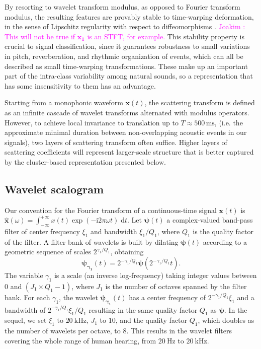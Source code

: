 \documentclass[journal]{IEEEtran}
\makeatletter
\newcommand*{\ie}{i.e.\@\xspace}
\newcommand{\ja}[1]{\textcolor{magenta}{Joakim : #1}}
\makeatother
\begin{document}
By resorting to wavelet transform modulus, as opposed to Fourier transform modulus, the resulting features are provably stable to time-warping deformation,
in the sense of Lipschitz regularity with respect to diffeomorphisms \cite{Mallat2012}. \ja{This will not be true if $\boldsymbol{x_1}$ is an STFT, for example.}
This stability property is crucial to signal classification, since it guarantees robustness to small variations in pitch, reverberation, and rhythmic organization of events, which can all be described as small time-warping transformations. These make up an important part of the intra-class variability among natural sounds, so a representation that has some insensitivity to them has an advantage.

Starting from a monophonic waveform $\boldsymbol{x}(t)$, the scattering transform is defined as an infinite cascade of wavelet transforms alternated with modulus operators.
However, to achieve local invariance to translation up to $T \approx 500\,\mathrm{ms}$, (\ie the approximate minimal duration between non-overlapping acoustic events in our signals), two layers of scattering transform often suffice. Higher layers of scattering coefficients will represent larger-scale structure that is better captured by the cluster-based representation presented below.

\subsection{Wavelet scalogram}
Our convention for the Fourier transform of a continuous-time signal $\boldsymbol{x}(t)$ is $\boldsymbol{\hat{x}}(\omega) = \int_{-\infty}^{+\infty} x(t) \exp(- \mathrm{i} 2\pi \omega t) \; \mathrm{d}t$.
Let $\boldsymbol{\psi}(t)$ a complex-valued band-pass filter of
center frequency $\xi_1$ and bandwidth $\xi_1/Q_1$, where $Q_1$ is the quality factor of the filter.
A filter bank of wavelets is built by dilating $\boldsymbol{\psi}(t)$
according to a geometric sequence of scales $2^{\gamma_1/Q_1}$, obtaining
\begin{equation}
\boldsymbol{\psi_{\gamma_1}}(t) = 2^{-\gamma_1/Q_1} \boldsymbol{\psi}(2^{-\gamma_1/Q_1} t)\mbox{.}
\end{equation}
The variable $\gamma_1$ is a scale (an inverse log-frequency) taking integer values between $0$ and $(J_1 \times Q_1 - 1)$, where $J_1$ is the number of octaves spanned by the filter bank.
For each $\gamma_1$, the wavelet $\boldsymbol{\psi_{\gamma_1}}(t)$
has a center frequency of $2^{-\gamma_1/Q_1}\xi_1$ and a bandwidth of $2^{-\gamma_1/Q_1}\xi_1/Q_1$ resulting in the same quality factor $Q_1$ as $\boldsymbol{\psi}$.
In the sequel, we set $\xi_1$ to $20~\mathrm{kHz}$, $J_1$ to $10$, and the quality factor $Q_1$, which doubles as the number of wavelets per octave, to $8$. This results in the wavelet filters covering the whole range of human hearing, from $20~\mathrm{Hz}$ to $20~\mathrm{kHz}$.
\end{document}

